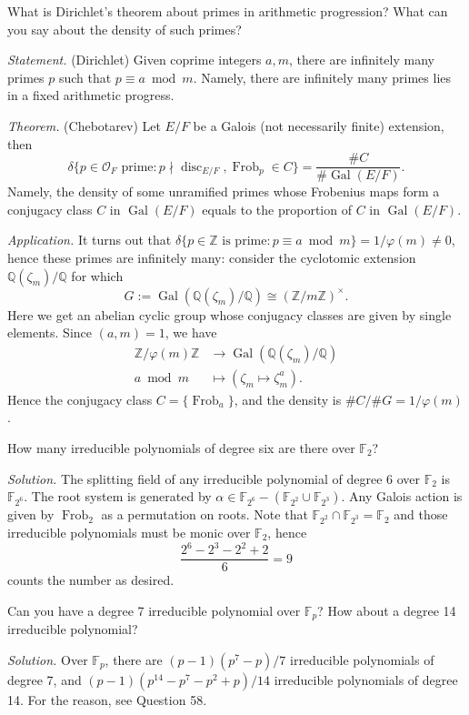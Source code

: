 \documentclass{mathproblems}
\newcommand\Q{\mathbb{Q}}
\newcommand\Z{\mathbb{Z}}
\newcommand\OO{\mathcal{O}}
\newcommand\F{\mathbb{F}}
\DeclareMathOperator{\Gal}{Gal}
\DeclareMathOperator{\disc}{disc}
\begin{document}
\begin{questions}
\miquestion
{\color{blue}
What is Dirichlet's theorem about primes in arithmetic progression? What can you say about the density of such primes?}

\textit{Statement.} (Dirichlet) Given coprime integers $a,m$, there are infinitely many primes $p$ such that $p\equiv a\bmod m$. Namely, there are infinitely many primes lies in a fixed arithmetic progress.

{\color{violet}
\textit{Theorem.} (Chebotarev) Let $E/F$ be a Galois (not necessarily finite) extension, then 
$$
\delta\{p\in \OO_F \text{ prime}: p\nmid \disc_{E/F}, \operatorname{Frob}_p\in C\}=\frac{\#C}{\#\Gal(E/F)}.
$$
Namely, the density of some unramified primes whose Frobenius maps form a conjugacy class $C$ in $\Gal(E/F)$ equals to the proportion of $C$ in $\Gal(E/F)$.
}

\textit{Application.} It turns out that $\delta\{p\in \Z \text{ is prime}: p\equiv a\bmod m\}=1/\varphi(m)\neq 0$, hence these primes are infinitely many: consider the cyclotomic extension $\Q(\zeta_m)/\Q$ for which
$$
G:=\Gal(\Q(\zeta_m)/\Q)\cong (\Z/m\Z)^\times.
$$
Here we get an abelian cyclic group whose conjugacy classes are given by single elements. Since $(a,m)=1$, we have
$$
\begin{aligned}
\Z/\varphi(m)\Z & \longrightarrow \Gal(\Q(\zeta_m)/\Q)\\
a\bmod m & \longmapsto (\zeta_m\mapsto \zeta_m^a).
\end{aligned}
$$
Hence the conjugacy class $C=\{\operatorname{Frob}_a\}$, and the density is $\#C/\#G=1/\varphi(m)$.


\miquestion
{\color{blue} How many irreducible polynomials of degree six are there over $\F_{2}$?}

\textit{Solution.}
The splitting field of any irreducible polynomial of degree 6 over $\F_2$ is $\F_{2^6}$. The root system is generated by $\alpha\in \F_{2^6} - (\F_{2^2}\cup \F_{2^3})$. Any Galois action is given by $\operatorname{Frob}_2$ as a permutation on roots. Note that $\F_{2^2}\cap \F_{2^3}=\F_2$ and those irreducible polynomials must be monic over $\F_2$, hence
$$
\frac{2^6-2^3-2^2+2}{6}=9
$$
counts the number as desired.

\miquestion
{\color{blue} Can you have a degree 7 irreducible polynomial over $\F_{p}$? How about a degree 14 irreducible polynomial?}

\textit{Solution.}
Over $\F_{p}$, there are $(p-1)(p^7-p)/7$ irreducible polynomials of degree 7, and $(p-1)(p^{14}-p^7-p^2+p)/14$ irreducible polynomials of degree 14. For the reason, see Question 58.


\end{questions}
\end{document}
